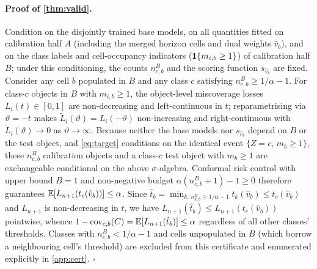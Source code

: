 \paragraph{Proof of \cref{thm:valid}.}
Condition on the disjointly trained base models, on all quantities fitted on calibration half $A$ (including the merged horizon cells and dual weights $\hat v_b$), and on the class labels and cell-occupancy indicators ($\mathbf{1}\{m_{i,b}\ge1\}$) of calibration half $B$; under this conditioning, the counts $n^B_{c,b}$ and the scoring function $s_{\hat v_b}$ are fixed.
Consider any cell $b$ populated in $B$ and any class $c$ satisfying $n^B_{c,b}\ge1/\alpha-1$.
For class-$c$ objects in $B$ with $m_{i,b}\ge1$, the object-level miscoverage losses $L_i(t)\in[0,1]$ are non-decreasing and left-continuous in $t$; reparametrising via $\vartheta=-t$ makes $\tilde L_i(\vartheta)=L_i(-\vartheta)$ non-increasing and right-continuous with $\tilde L_i(\vartheta)\to0$ as $\vartheta\to\infty$.
Because neither the base models nor $s_{\hat v_b}$ depend on $B$ or the test object, and \cref{eq:target} conditions on the identical event $\{Z=c,\, m_b\ge1\}$, these $n^B_{c,b}$ calibration objects and a class-$c$ test object with $m_b\ge1$ are exchangeable conditional on the above $\sigma$-algebra.
Conformal risk control \citep[Thm.~1]{angelopoulos2024conformal} with upper bound $B=1$ and non-negative budget $\alpha(n^B_{c,b}+1)-1\ge0$ therefore guarantees $\mathbb{E}[L_{n+1}(t_c(\hat v_b))]\le\alpha$.
Since $\hat t_b=\min_{k:\,n^B_{k,b}\ge1/\alpha-1} t_k(\hat v_b)\le t_c(\hat v_b)$ and $L_{n+1}$ is non-decreasing in $t$, we have $L_{n+1}(\hat t_b)\le L_{n+1}(t_c(\hat v_b))$ pointwise, whence $1-\operatorname{cov}_{c,b}(C)=\mathbb{E}[L_{n+1}(\hat t_b)]\le\alpha$ regardless of all other classes' thresholds.
Classes with $n^B_{c,b}<1/\alpha-1$ and cells unpopulated in $B$ (which borrow a neighbouring cell's threshold) are excluded from this certificate and enumerated explicitly in \cref{app:cert}.
\hfill$\square$


